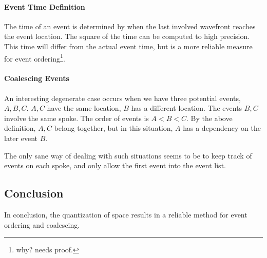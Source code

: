 \documentclass[12pt,a4paper,oneside,openany]{article}
\begin{document}
\paragraph{Event Time Definition}

The time of an event is determined by when the last involved wavefront reaches the event location. The square of the time can be computed to high precision. This time will differ from the actual event time, but is a more reliable measure for event ordering\footnote{why? needs proof.}.

\paragraph{Coalescing Events}

An interesting degenerate case occurs when we have three potential events, $A,B,C$. $A,C$ have the same location, $B$ has a different location. The events $B,C$ involve the same spoke. The order of events is $A < B < C$. By the above definition, $A,C$ belong together, but in this situation, $A$ has a dependency on the later event $B$.

The only sane way of dealing with such situations seems to be to keep track of events on each spoke, and only allow the first event into the event list.

\subsection{Conclusion}

In conclusion, the quantization of space results in a reliable method for event ordering and coalescing.


\nocite{*}



\end{document}
